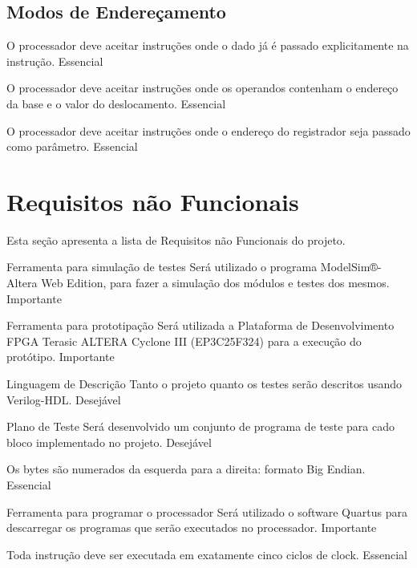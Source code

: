 \documentclass{article}
\begin{document}
     \subsection{Modos de Endereçamento}

    \begin{functional}

      {O processador deve aceitar instruções onde o dado já é passado explicitamente na instrução.}
      {Essencial}

      {O processador deve aceitar instruções onde os operandos contenham o endereço da base e o valor do deslocamento.}
      {Essencial}

      {O processador deve aceitar instruções onde o endereço do registrador seja passado como parâmetro.}
      {Essencial}

     \end{functional}


\section{Requisitos não Funcionais}
Esta seção apresenta a lista de Requisitos não Funcionais do projeto.

  \begin{nonfunctional}

    \requirement
    {Ferramenta para simulação de testes}
    {Será utilizado o programa ModelSim®-Altera Web Edition, para fazer a simulação dos módulos e testes dos mesmos.}
    {Importante}

    \requirement
    {Ferramenta para prototipação}
    {Será utilizada a Plataforma de Desenvolvimento FPGA  Terasic ALTERA Cyclone III (EP3C25F324) para a execução do protótipo.}
    {Importante}

    \requirement
    {Linguagem de Descrição}
    {Tanto o projeto quanto os testes serão descritos usando Verilog-HDL.}
    {Desejável}

    \requirement
    {Plano de Teste}
    {Será desenvolvido um conjunto de programa de teste para cado bloco implementado no projeto. }
    {Desejável}

    {Os bytes são numerados da esquerda para a direita: formato Big Endian.}
    {Essencial}

    \requirement
    {Ferramenta para programar o processador}
    {Será utilizado o software Quartus para descarregar os programas que serão executados no processador.}
    {Importante}


    {Toda instrução deve ser executada em exatamente cinco ciclos de clock.}
    {Essencial}

  \end{nonfunctional}
\end{document}
